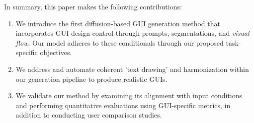 \noindent In summary, this paper makes the following contributions:
\begin{enumerate}
\item We introduce the first diffusion-based GUI generation method that incorporates GUI design control through prompts, segmentations, and \textit{visual flow}. Our model adheres to these conditionals through our proposed task-specific objectives. 
\item We address and automate coherent 'text drawing' and harmonization within our generation pipeline to produce realistic GUIs.
\item We validate our method by examining its alignment with input conditions and performing quantitative evaluations using GUI-specific metrics, in addition to conducting user comparison studies.
\end{enumerate}





